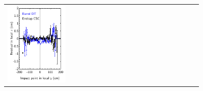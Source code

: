 \documentclass[12pt]{article}
\begin{document}
\begin{figure}
\begin{center}
\begin{tabular}{p{0.3\linewidth} p{0.3\linewidth} p{0.3\linewidth}}
\begin{minipage}{\linewidth}
	\includegraphics[width=\linewidth]{chamber_alignment/init_xresid_vs_y.pdf}
      \end{minipage} &
      \begin{minipage}{\linewidth}

\end{minipage}
\end{tabular}
\end{center}
\end{figure}
\end{document}
